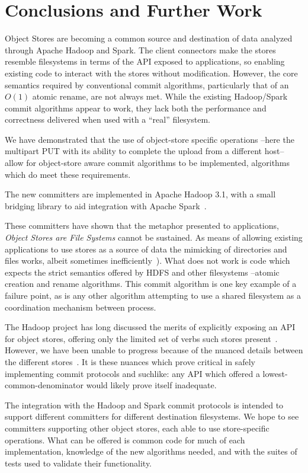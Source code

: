 \documentclass[conference]{IEEEtran}
\begin{document}
\section{Conclusions and Further Work}
\label{sec:conclusions}

Object Stores are becoming a common source and destination of data analyzed
through Apache Hadoop and Spark.
The client connectors make the stores resemble filesystems in
terms of the API exposed to applications, so enabling existing code to
interact with the stores without modification.
However, the core semantics required by conventional commit algorithms, particularly
that of an $O(1)$ atomic rename, are not always met.
While the existing Hadoop/Spark commit algorithms appear to work, they lack
both the performance and correctness delivered when used with a ``real'' filesystem.

We have demonstrated that the use of object-store specific operations --here
the multipart PUT with its ability to complete the upload from a different host--
allow for object-store aware commit algorithms to be implemented,
algorithms which do meet these requirements.

The new committers are implemented in Apache Hadoop 3.1, with a small bridging
library to aid integration with Apache Spark\ \cite{HADOOP-13786}.


These committers have shown that the metaphor presented to applications,
\emph{Object Stores are File Systems} cannot be sustained.
As means of allowing existing applications to use stores as a source
of data the mimicking of directories and files works, albeit sometimes
inefficiently\ \cite{HADOOP-13208}).
What does not work is code which expects the strict semantics
offered by HDFS and other filesystems --atomic creation and rename algorithms.
This commit algorithm is one key example of a failure point, as
is any other algorithm attempting to use a shared filesystem
as a coordination mechanism between process.

The Hadoop project has long discussed the merits of explicitly
exposing an API for object stores, offering only the limited
set of verbs such stores present\ \cite{HADOOP-9565}.
However, we have been unable to progress because of the nuanced details
between the different stores\ \cite{S3, WASB, ADL, GCS}.
It is these nuances which prove critical in safely implementing
commit protocols and suchlike: any API which offered a lowest-common-denominator
would likely prove itself inadequate.

The integration with the Hadoop and Spark commit protocols is intended
to support different committers for different destination filesystems.
We hope to see committers supporting other object stores, each
able to use store-specific operations.
What can be offered is common code for much of each implementation,
knowledge of the new algorithms needed, and
with the suites of tests used to validate their functionality.
\end{document}
